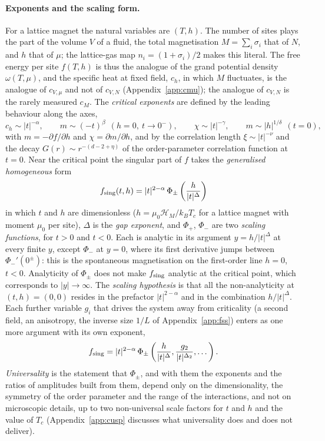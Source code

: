 \documentclass[10pt,a4paper]{article}
\theoremstyle{remark}
\newcommand{\hmag}{\mathcal{H}_M}
\begin{document}
\paragraph{Exponents and the scaling form.} For a lattice magnet the natural
variables are $(T,h)$. The number of sites plays the part of the volume $V$ of
a fluid, the total magnetisation $M=\sum_i\sigma_i$ that of $N$, and $h$ that
of $\mu$; the lattice-gas map $n_i=(1+\sigma_i)/2$ makes this literal. The
free energy per site $f(T,h)$ is thus the analogue of the grand potential
density $\omega(T,\mu)$, and the specific heat at fixed field, $c_h$, in which
$M$ fluctuates, is the analogue of $c_{V,\mu}$ and not of $c_{V,N}$
(Appendix~\ref{app:cmu}); the analogue of $c_{V,N}$ is the rarely measured
$c_M$. The
\emph{critical exponents} are defined by the leading behaviour along the axes,
\begin{equation}\label{eq:exponents}
  c_h\sim|t|^{-\alpha},\qquad
  m\sim(-t)^{\beta}\ \ (h=0,\ t\to0^{-}),\qquad
  \chi\sim|t|^{-\gamma},\qquad
  m\sim|h|^{1/\delta}\ \ (t=0),
\end{equation}
with $m=-\partial f/\partial h$ and $\chi=\partial m/\partial h$, and by the
correlation length $\xi\sim|t|^{-\nu}$ and the decay $G(r)\sim r^{-(d-2+\eta)}$
of the order-parameter correlation function at $t=0$. Near the critical point
the singular part of $f$ takes the \emph{generalised homogeneous} form
\begin{equation}\label{eq:scaling}
  f_{\rm sing}(t,h)=|t|^{2-\alpha}\,\Phi_\pm\left(\frac{h}{|t|^{\Delta}}\right)
\end{equation}
in which $t$ and $h$ are dimensionless ($h=\mu_0\hmag{}/k_BT_c$ for a
lattice magnet with moment $\mu_0$ per site), $\Delta$ is the \emph{gap
exponent}, and $\Phi_+$, $\Phi_-$ are two \emph{scaling functions}, for $t>0$
and $t<0$. Each is analytic in its argument $y=h/|t|^{\Delta}$ at every finite
$y$, except $\Phi_-$ at $y=0$, where its first derivative jumps between
$\Phi_-'(0^{\pm})$: this is the spontaneous magnetisation on the first-order
line $h=0$, $t<0$. Analyticity of $\Phi_\pm$ does not make $f_{\rm sing}$
analytic at the critical point, which corresponds to $|y|\to\infty$. The
\emph{scaling hypothesis} is that all the non-analyticity at $(t,h)=(0,0)$
resides in the prefactor $|t|^{2-\alpha}$ and in the combination
$h/|t|^{\Delta}$. Each further variable $g_i$ that drives the system away from
criticality (a second field, an anisotropy, the inverse size $1/L$ of
Appendix~\ref{app:fss}) enters as one more argument with its own exponent,
\[
  f_{\rm sing}=|t|^{2-\alpha}\,\Phi_\pm\left(\frac{h}{|t|^{\Delta}},
  \frac{g_2}{|t|^{\Delta_2}},\dots\right) .
\] \emph{Universality} is the statement that $\Phi_\pm$, and with them the
exponents and the ratios of amplitudes built from them, depend only on the
dimensionality, the symmetry of the order parameter and the range of the
interactions, and not on microscopic details, up to two non-universal scale
factors for $t$ and $h$ and the value of $T_c$ (Appendix~\ref{app:cusp}
discusses what universality does and does not deliver).
\end{document}
